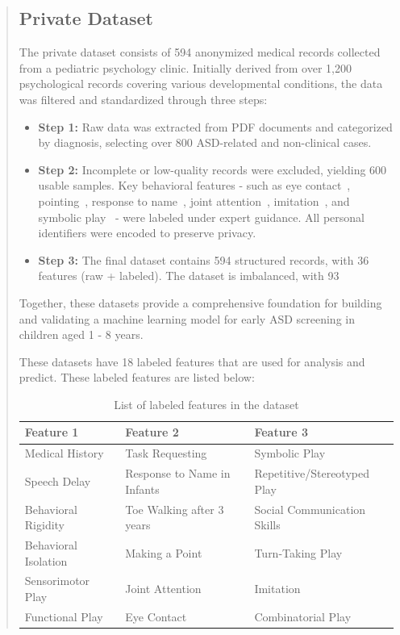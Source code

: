 \documentclass[runningheads]{llncs}
\begin{document}
\begin{abstract}
\subsection*{Private Dataset}
The private dataset consists of 594 anonymized medical records collected from a pediatric psychology clinic. Initially derived from over 1,200 psychological records covering various developmental conditions, the data was filtered and standardized through three steps:
\begin{itemize}
\item \textbf{Step 1:} Raw data was extracted from PDF documents and categorized by diagnosis, selecting over 800 ASD-related and non-clinical cases.
\item \textbf{Step 2:} Incomplete or low-quality records were excluded, yielding 600 usable samples. Key behavioral features - such as eye contact~\cite{b11}, pointing~\cite{b12}, response to name~\cite{b13}, joint attention~\cite{b14}, imitation~\cite{b15}, and symbolic play~\cite{b16} - were labeled under expert guidance. All personal identifiers were encoded to preserve privacy.
\item \textbf{Step 3:} The final dataset contains 594 structured records, with 36 features (raw + labeled). The dataset is imbalanced, with 93%
\end{itemize}

Together, these datasets provide a comprehensive foundation for building and validating a machine learning model for early ASD screening in children aged 1 - 8 years.

These datasets have 18 labeled features that are used for analysis and predict. These labeled features are listed below:

\newcommand{\attrrow}[1]{%
  \stepcounter{attr}\theattr & #1 \\ }  %

\begin{table}[htbp]
  \centering
  \caption{List of labeled features in the dataset}
  \begin{tabular}{@{}lll@{}}
    \toprule
    \textbf{Feature 1} & \textbf{Feature 2} & \textbf{Feature 3} \\ \midrule
    Medical History & Task Requesting & Symbolic Play \\
    Speech Delay & Response to Name in Infants & Repetitive/Stereotyped Play \\
    Behavioral Rigidity & Toe Walking after 3 years & Social Communication Skills \\
    Behavioral Isolation & Making a Point & Turn-Taking Play \\
    Sensorimotor Play & Joint Attention & Imitation \\
    Functional Play & Eye Contact & Combinatorial Play \\
    \bottomrule
  \end{tabular}
\end{table}




\end{abstract}
\end{document}
